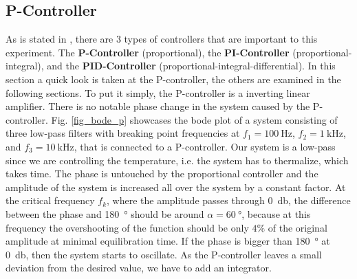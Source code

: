 \documentclass[a4paper,10pt]{article}
\begin{document}
\subsection{P-Controller}
As is stated in \cite{script}, there are 3 types of controllers that are important to this experiment. The \textbf{P-Controller} (proportional), the \textbf{PI-Controller} (proportional-integral), and the \textbf{PID-Controller} (proportional-integral-differential). In this section a quick look is taken at the P-controller, the others are examined in the following sections.
\newline
To put it simply, the P-controller is a inverting linear amplifier. There is no notable phase change in the system caused by the P-controller. Fig. \ref{fig_bode_p} showcases the bode plot of a system consisting of three low-pass filters with breaking point frequencies at $f_1 = \SI{100}{\hertz}$, $f_2 = \SI{1}{\kilo \hertz}$, and $f_3 = \SI{10}{\kilo\hertz}$, that is connected to a P-controller. Our system is a low-pass since we are controlling the temperature, i.e. the system has to thermalize, which takes time.
\newline
The phase is untouched by the proportional controller and the amplitude of the system is increased all over the system by a constant factor. At the  critical frequency $f_k$, where the amplitude passes through \SI{0}{\decibel}, the difference between the phase and \SI{180}{\degree} should be around $\alpha = \SI{60}{\degree}$, because at this frequency the overshooting of the function should be only $4\%$ of the original amplitude at minimal equilibration time.\cite{halbleiter} If the phase is bigger than \SI{180}{\degree} at \SI{0}{\decibel}, then the system starts to oscillate. As the P-controller leaves a small deviation from the desired value, we have to add an integrator.
\end{document}
